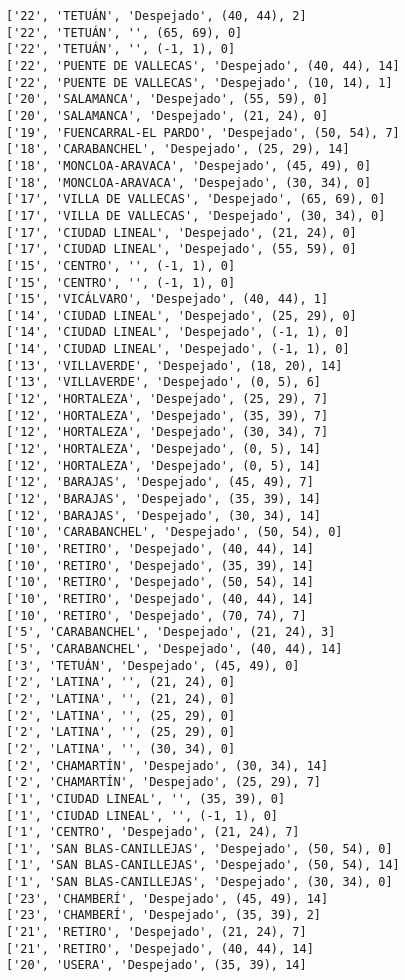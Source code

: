 \documentclass[11pt]{article}
\begin{document}
\begin{Verbatim}[commandchars=\\\{\}]
['22', 'TETUÁN', 'Despejado', (40, 44), 2]
['22', 'TETUÁN', '', (65, 69), 0]
['22', 'TETUÁN', '', (-1, 1), 0]
['22', 'PUENTE DE VALLECAS', 'Despejado', (40, 44), 14]
['22', 'PUENTE DE VALLECAS', 'Despejado', (10, 14), 1]
['20', 'SALAMANCA', 'Despejado', (55, 59), 0]
['20', 'SALAMANCA', 'Despejado', (21, 24), 0]
['19', 'FUENCARRAL-EL PARDO', 'Despejado', (50, 54), 7]
['18', 'CARABANCHEL', 'Despejado', (25, 29), 14]
['18', 'MONCLOA-ARAVACA', 'Despejado', (45, 49), 0]
['18', 'MONCLOA-ARAVACA', 'Despejado', (30, 34), 0]
['17', 'VILLA DE VALLECAS', 'Despejado', (65, 69), 0]
['17', 'VILLA DE VALLECAS', 'Despejado', (30, 34), 0]
['17', 'CIUDAD LINEAL', 'Despejado', (21, 24), 0]
['17', 'CIUDAD LINEAL', 'Despejado', (55, 59), 0]
['15', 'CENTRO', '', (-1, 1), 0]
['15', 'CENTRO', '', (-1, 1), 0]
['15', 'VICÁLVARO', 'Despejado', (40, 44), 1]
['14', 'CIUDAD LINEAL', 'Despejado', (25, 29), 0]
['14', 'CIUDAD LINEAL', 'Despejado', (-1, 1), 0]
['14', 'CIUDAD LINEAL', 'Despejado', (-1, 1), 0]
['13', 'VILLAVERDE', 'Despejado', (18, 20), 14]
['13', 'VILLAVERDE', 'Despejado', (0, 5), 6]
['12', 'HORTALEZA', 'Despejado', (25, 29), 7]
['12', 'HORTALEZA', 'Despejado', (35, 39), 7]
['12', 'HORTALEZA', 'Despejado', (30, 34), 7]
['12', 'HORTALEZA', 'Despejado', (0, 5), 14]
['12', 'HORTALEZA', 'Despejado', (0, 5), 14]
['12', 'BARAJAS', 'Despejado', (45, 49), 7]
['12', 'BARAJAS', 'Despejado', (35, 39), 14]
['12', 'BARAJAS', 'Despejado', (30, 34), 14]
['10', 'CARABANCHEL', 'Despejado', (50, 54), 0]
['10', 'RETIRO', 'Despejado', (40, 44), 14]
['10', 'RETIRO', 'Despejado', (35, 39), 14]
['10', 'RETIRO', 'Despejado', (50, 54), 14]
['10', 'RETIRO', 'Despejado', (40, 44), 14]
['10', 'RETIRO', 'Despejado', (70, 74), 7]
['5', 'CARABANCHEL', 'Despejado', (21, 24), 3]
['5', 'CARABANCHEL', 'Despejado', (40, 44), 14]
['3', 'TETUÁN', 'Despejado', (45, 49), 0]
['2', 'LATINA', '', (21, 24), 0]
['2', 'LATINA', '', (21, 24), 0]
['2', 'LATINA', '', (25, 29), 0]
['2', 'LATINA', '', (25, 29), 0]
['2', 'LATINA', '', (30, 34), 0]
['2', 'CHAMARTÍN', 'Despejado', (30, 34), 14]
['2', 'CHAMARTÍN', 'Despejado', (25, 29), 7]
['1', 'CIUDAD LINEAL', '', (35, 39), 0]
['1', 'CIUDAD LINEAL', '', (-1, 1), 0]
['1', 'CENTRO', 'Despejado', (21, 24), 7]
['1', 'SAN BLAS-CANILLEJAS', 'Despejado', (50, 54), 0]
['1', 'SAN BLAS-CANILLEJAS', 'Despejado', (50, 54), 14]
['1', 'SAN BLAS-CANILLEJAS', 'Despejado', (30, 34), 0]
['23', 'CHAMBERÍ', 'Despejado', (45, 49), 14]
['23', 'CHAMBERÍ', 'Despejado', (35, 39), 2]
['21', 'RETIRO', 'Despejado', (21, 24), 7]
['21', 'RETIRO', 'Despejado', (40, 44), 14]
['20', 'USERA', 'Despejado', (35, 39), 14]

\end{Verbatim}
\end{document}
